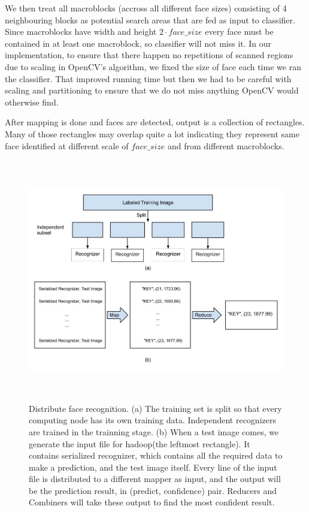 \documentclass[11pt, draftclsnofoot, onecolumn]{IEEEtran}
\begin{document}
We then treat all macroblocks (accross all different face sizes) consisting of 4 neighbouring blocks as potential search areas that are fed as input to classifier. Since macroblocks have width and height $2 \cdot face\_size$ every face must be contained in at least one macroblock, so classifier will not miss it. In our implementation, to ensure that there happen no repetitions of scanned regions due to scaling in OpenCV's algorithm, we fixed the size of face each time we ran the classifier. That improved running time but then we had to be careful with scaling and partitioning to ensure that we do not miss anything OpenCV would otherwise find.

After mapping is done and faces are detected, output is a collection of rectangles. Many of those rectangles may overlap quite a lot indicating they represent same face identified at different scale of $face\_size$ and from different macroblocks.

\begin{figure}
\centering
\includegraphics[height=300pt]{recog_overview}
\caption{Distribute face recognition. (a) The training set is split so that every computing node has its own training data. Independent recognizers are trained in the trainning stage. (b) When a test image comes, we generate the input file for hadoop(the leftmost rectangle). It contains serialized recognizer, which contains all the required data to make a prediction, and the test image itself. Every line of the input file is distributed to a different mapper as input, and the output will be the prediction result, in (predict, confidence) pair. Reducers and Combiners will take these output to find the most confident result.}
\label{fig:recog_overview}
\end{figure}
\end{document}
